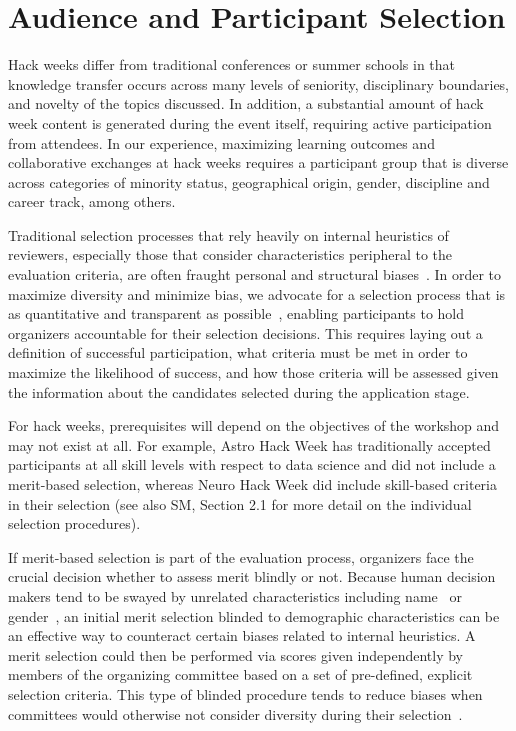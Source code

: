 \section*{Audience and Participant Selection}

Hack weeks differ from traditional conferences or summer schools in that knowledge transfer occurs across many levels of seniority, disciplinary boundaries, and novelty of the topics discussed.
In addition, a substantial amount of hack week content is generated during the event itself, requiring active participation from attendees.
In our experience, maximizing learning outcomes and collaborative exchanges at hack weeks requires a participant group that is diverse across categories of minority status, geographical origin, gender, discipline and career track, among others. 

Traditional selection processes that rely heavily on internal heuristics of reviewers, especially those that consider characteristics peripheral to the evaluation criteria, are often fraught personal and structural biases~\cite[e.g.][]{sunstein2015wiser}. 
In order to maximize diversity and minimize bias, we advocate for a selection process that is as quantitative and transparent as possible~\cite{sunstein2015wiser}, enabling participants to hold organizers accountable for their selection decisions.
This requires laying out a definition of successful participation, what criteria must be met in order to maximize the likelihood of success, and how those criteria will be assessed given the information about the candidates selected during the application stage.  

For hack weeks, prerequisites will depend on the objectives of the workshop and may not exist at all. For example, Astro Hack Week has traditionally accepted participants at all skill levels with respect to data science and did not include a merit-based selection, whereas Neuro Hack Week did include skill-based criteria in their selection (see also SM, Section 2.1 for more detail on the individual selection procedures). 

If merit-based selection is part of the evaluation process, organizers face the crucial decision whether to assess merit blindly or not. Because human decision makers tend to be swayed by unrelated characteristics including name~\cite{bertrand2004} or gender~\cite{mossracusin2012}, an initial merit selection blinded to demographic characteristics can be an effective way to counteract certain biases related to internal heuristics. A merit selection could then be performed via scores given independently by members of the organizing committee based on a set of pre-defined, explicit selection criteria. This type of blinded procedure tends to reduce biases when committees would otherwise not consider diversity during their selection~\cite{bohnet2016}. 

